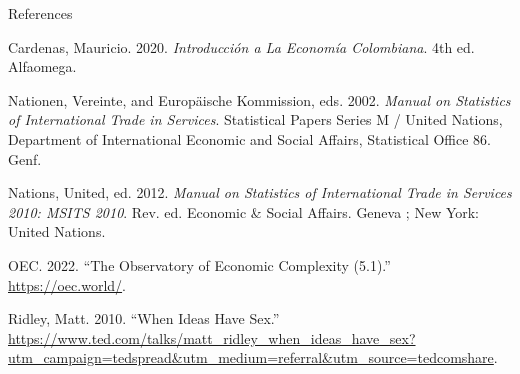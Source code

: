 \documentclass[
  ignorenonframetext,
]{beamer}
\newlength{\cslhangindent}
\newenvironment{CSLReferences}[2] %
 {\begin{list}{}{%
  \setlength{\itemindent}{0pt}
  \setlength{\leftmargin}{0pt}
  \setlength{\parsep}{0pt}
  \ifodd #1
   \setlength{\leftmargin}{\cslhangindent}
   \setlength{\itemindent}{-1\cslhangindent}
  \fi
  \setlength{\itemsep}{#2\baselineskip}}}
 {\end{list}}
\begin{document}
\begin{frame}[allowframebreaks]{References}
\label{refs}
\begin{CSLReferences}{1}{0}
Cardenas, Mauricio. 2020. \emph{Introducción a La {Economía}
{Colombiana}}. 4th ed. Alfaomega.

Nationen, Vereinte, and Europäische Kommission, eds. 2002. \emph{Manual
on Statistics of International Trade in Services}. Statistical Papers
{Series} {M} / {United} {Nations}, {Department} of {International}
{Economic} and {Social} {Affairs}, {Statistical} {Office} 86. Genf.

Nations, United, ed. 2012. \emph{Manual on {Statistics} of
{International} {Trade} in {Services} 2010: {MSITS} 2010}. Rev. ed.
Economic \& {Social} {Affairs}. Geneva ; New York: United Nations.

OEC. 2022. {``The {Observatory} of {Economic} {Complexity} (5.1).''}
\url{https://oec.world/}.

Ridley, Matt. 2010. {``When Ideas Have Sex.''}
\url{https://www.ted.com/talks/matt_ridley_when_ideas_have_sex?utm_campaign=tedspread&utm_medium=referral&utm_source=tedcomshare}.

\end{CSLReferences}
\end{frame}
\end{document}
